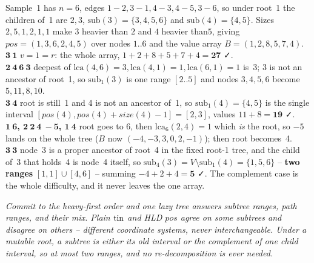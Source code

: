 \begin{hardeningbox}
Sample~1 has \(n=6\), edges \(1\!-\!2,3\!-\!1,4\!-\!3,4\!-\!5,3\!-\!6\), so under root~1 the children of~1 are \(2,3\), \(\text{sub}(3)=\{3,4,5,6\}\) and \(\text{sub}(4)=\{4,5\}\). Sizes \(2,5,1,2,1,1\) make \(3\) heavier than \(2\) and \(4\) heavier than\(5\), giving \(\mathit{pos}=(1,3,6,2,4,5)\) over nodes \(1..6\) and the value array \(B=(1,2,8,5,7,4)\).\\
\textbf{\(\mathbf{3\ 1}\)} \(v=1=r\): the whole array, \(1{+}2{+}8{+}5{+}7{+}4=\mathbf{27}\) ✓.\\
\textbf{\(\mathbf{2\ 4\ 6\ 3}\)} deepest of \(\mathrm{lca}(4,6)=3,\mathrm{lca}(4,1)=1,\mathrm{lca}(6,1)=1\) is~3; 3 is not an ancestor of root~1, so \(\text{sub}_1(3)\) is one range \([2..5]\) and nodes \(3,4,5,6\) become \(5,11,8,10\).\\
\textbf{\(\mathbf{3\ 4}\)} root is still~1 and 4 is not an ancestor of~1, so \(\text{sub}_1(4)=\{4,5\}\) is the single interval \([\mathit{pos}(4),\mathit{pos}(4)+\mathit{size}(4)-1]=[2,3]\), values \(11+8=\mathbf{19}\) ✓.\\
\textbf{\(\mathbf{1\ 6}\), \(\mathbf{2\ 2\ 4\ {-}5}\), \(\mathbf{1\ 4}\)} root goes to 6, then \(\mathrm{lca}_6(2,4)=1\) which \emph{is} the root, so \(-5\) lands on the whole tree (\(B\) now \((-4,-3,3,0,2,-1)\)); then root becomes~4.\\
\textbf{\(\mathbf{3\ 3}\)} node~3 is a proper ancestor of root~4 in the fixed root-1 tree, and the child of~3 that holds~4 is node~4 itself, so \(\text{sub}_4(3)=V\setminus\text{sub}_1(4)=\{1,5,6\}\) -- \textbf{two ranges} \([1,1]\cup[4,6]\) -- summing \(-4+2+4=\mathbf{5}\) ✓. The complement case is the whole difficulty, and it never leaves the one array.
\end{hardeningbox}

\begin{recallbox}
\emph{Commit to the heavy-first order and one lazy tree answers subtree ranges, path ranges, and their mix. Plain \(\operatorname{tin}\) and HLD \(\mathit{pos}\) agree on some subtrees and disagree on others -- different coordinate systems, never interchangeable. Under a mutable root, a subtree is either its old interval or the complement of one child interval, so at most two ranges, and no re-decomposition is ever needed.}
\end{recallbox}
